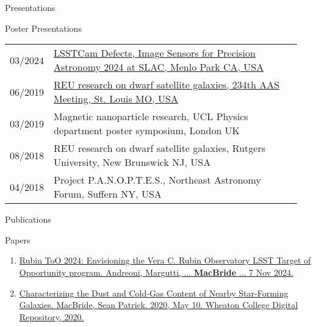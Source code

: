 \documentclass{resume} %
\begin{document}
\begin{rSection}{Presentations}
\begin{rSubsection}{Poster Presentations}{}{}{}
\begin{table}[h]
\begin{tabular}{p{0.07\linewidth} p{0.88\linewidth}}
03/2024 & \href{https://indico.slac.stanford.edu/event/8442/contributions/8626/}{LSSTCam Defects, Image Sensors for Precision Astronomy 2024 at SLAC, Menlo Park CA, USA}\\
06/2019 & \href{https://assets.pubpub.org/d14kkapv/41575915658488.pdf}{REU research on dwarf satellite galaxies, 234th AAS Meeting, St. Louis MO, USA}\\
03/2019 & Magnetic nanoparticle research, UCL Physics department poster symposium, London UK\\
08/2018 & REU research on dwarf satellite galaxies, Rutgers University, New Brunswick NJ, USA\\
04/2018 & Project P.A.N.O.P.T.E.S., Northeast Astronomy Forum, Suffern NY, USA\\
\end{tabular}
\end{table}
\end{rSubsection}

\end{rSection}

\begin{rSection}{Publications}
    \begin{rSubsection}{Papers}{}{}{} %
        \begin{enumerate}
            \item \href{https://arxiv.org/abs/2411.04793}{Rubin ToO 2024: Envisioning the Vera C. Rubin Observatory LSST Target of Opportunity program. Andreoni, Margutti, ... \textbf{MacBride} ... 7 Nov 2024.} 
            \item \href{https://digitalrepository.wheatoncollege.edu/handle/11040/31192}{Characterizing the Dust and Cold-Gas Content of Nearby Star-Forming Galaxies. MacBride, Sean Patrick. 2020, May 10.  Wheaton College Digital Repository, 2020.}
        \end{enumerate}
            
    \end{rSubsection}    
\end{rSection}
\end{document}
